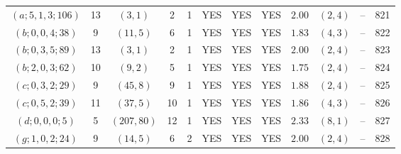 \begin{longtable}{|c|c|c|c|c|c|c|c|c|c|c|c|}
$(a;5,1,3;106)$ & 13 & $(3,1)$ & 2 & 1 & YES & YES & YES & $2.00$ & $(2,4)$ & -- & 821\\
$(b;0,0,4;38)$ & 9 & $(11,5)$ & 6 & 1 & YES & YES & YES & $1.83$ & $(4,3)$ & -- & 822\\
$(b;0,3,5;89)$ & 13 & $(3,1)$ & 2 & 1 & YES & YES & YES & $2.00$ & $(2,4)$ & -- & 823\\
$(b;2,0,3;62)$ & 10 & $(9,2)$ & 5 & 1 & YES & YES & YES & $1.75$ & $(2,4)$ & -- & 824\\
$(c;0,3,2;29)$ & 9 & $(45,8)$ & 9 & 1 & YES & YES & YES & $1.88$ & $(2,4)$ & -- & 825\\
$(c;0,5,2;39)$ & 11 & $(37,5)$ & 10 & 1 & YES & YES & YES & $1.86$ & $(4,3)$ & -- & 826\\
$(d;0,0,0;5)$ & 5 & $(207,80)$ & 12 & 1 & YES & YES & YES & $2.33$ & $(8,1)$ & -- & 827\\
$(g;1,0,2;24)$ & 9 & $(14,5)$ & 6 & 2 & YES & YES & YES & $2.00$ & $(2,4)$ & -- & 828
\end{longtable}

